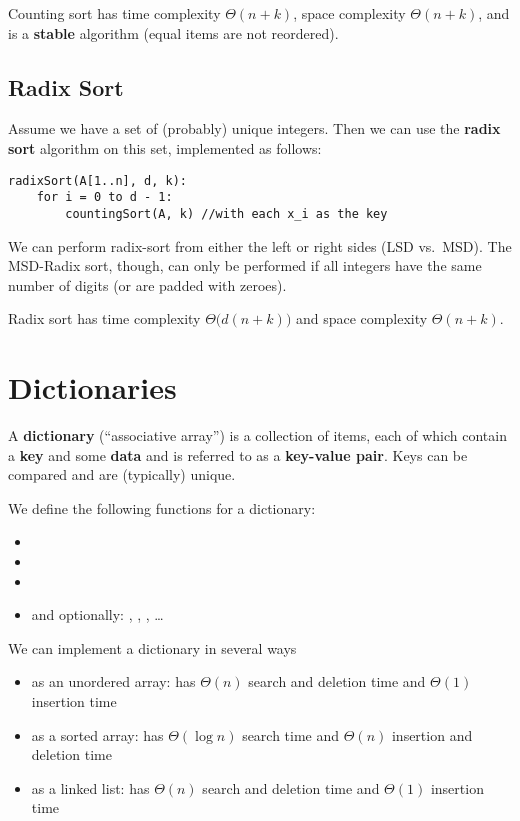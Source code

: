 \documentclass[12pt]{article}
\begin{document}
Counting sort has time complexity $\Theta(n+k)$, space complexity $\Theta(n+k)$, and is a {\bf stable} algorithm (equal items are not reordered).

\subsection{Radix Sort}
Assume we have a set of (probably) unique integers.  Then we can use the {\bf radix sort} algorithm on this set, implemented as follows:
\begin{verbatim}
radixSort(A[1..n], d, k):
    for i = 0 to d - 1:
        countingSort(A, k) //with each x_i as the key
\end{verbatim}

We can perform radix-sort from either the left or right sides (LSD vs.\ MSD). The MSD-Radix sort, though, can only be performed if all integers have the same number of digits (or are padded with zeroes).

Radix sort has time complexity $\Theta\bigl(d(n+k)\bigl)$ and space complexity $\Theta(n+k)$.

\section{Dictionaries}
A {\bf dictionary} (``associative array'') is a collection of items, each of which contain a {\bf key} and some {\bf data} and is referred to as a {\bf key-value pair}. Keys can be compared and are (typically) unique.

We define the following functions for a dictionary:
\begin{itemize}
\item {}
\item {}
\item {}
\item and optionally: , , , \dots
\end{itemize}

We can implement a dictionary in several ways
\begin{itemize}
\item as an unordered array: has $\Theta(n)$ search and deletion time and $\Theta(1)$ insertion time
\item as a sorted array: has $\Theta(\log n)$ search time and $\Theta(n)$ insertion and deletion time
\item as a linked list: has $\Theta(n)$ search and deletion time and $\Theta(1)$ insertion time
\end{itemize}
\end{document}
